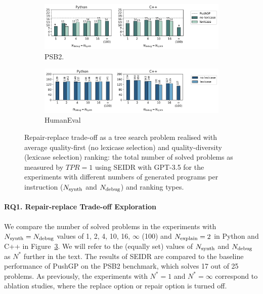 \begin{figure}[H]
\begin{subfigure}{\linewidth}
\centering
\includegraphics[width=\linewidth, trim={0mm 4mm 0mm 0mm}]{images/num_solved_problems_vs_bf_psb2_gpt35_01.pdf}
  \caption{PSB2.}
  \label{fig:psb2-gpt3.5}
\end{subfigure}
\begin{subfigure}{\columnwidth}
\centering
\includegraphics[width=\linewidth, trim={0mm 4mm 0mm 0mm}]{images/num_solved_problems_vs_bf_humaneval_gpt35_01.pdf}
  \caption{HumanEval}
  \label{fig:he-gpt3.5}
\end{subfigure}
\caption{Repair-replace trade-off as a tree search problem realised with average quality-first (no lexicase selection) and quality-diversity (lexicase  selection) ranking: the total number of solved problems as measured by $TPR=1$ using SEIDR with GPT-3.5 for the experiments with different numbers of generated programs per instruction ($N_\text{synth}$ and $N_\text{debug}{}$) and ranking types.}
\label{fig:repair-replace-trade-off-gpt3.5}
\vspace{-2ex}
\end{figure}




\paragraph{RQ1. Repair-replace Trade-off Exploration}
\label{sec:seidr-treearity-ollama}

We compare the number of solved problems in the experiments with $N_\text{synth}{}=N_\text{debug}{}$ values of 1, 2, 4, 10, 16, $\infty$ (100) and $N_\text{explain}{}=2$ in Python and C++ in Figure~\ref{fig:repair-replace-trade-off-gpt3.5}. 
We will refer to the (equally set) values of $N_\text{synth}{}$ and $N_\text{debug}{}$ as $N^*$ further in the text.
The results of SEIDR are compared to the baseline performance of PushGP on the PSB2 benchmark, which solves 17 out of 25 problems. 
As previously, the experiments with $N^*=1$ and $N^*=\infty$ correspond to ablation studies, where the replace option or repair option is turned off. 



